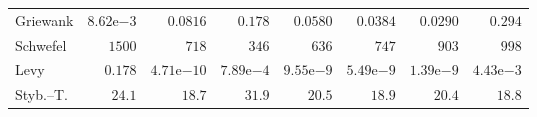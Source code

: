 \begin{tabular}{lrrrrrrr}
Griewank & $8.62\mathrm{e}{-3}$ & $0.0816$ & $0.178$ & $0.0580$ & $0.0384$ & $0.0290$ & $0.294$ \\
Schwefel & $1500$ & $718$ & $346$ & $636$ & $747$ & $903$ & $998$ \\
Levy & $0.178$ & $4.71\mathrm{e}{-10}$ & $7.89\mathrm{e}{-4}$ & $9.55\mathrm{e}{-9}$ & $5.49\mathrm{e}{-9}$ & $1.39\mathrm{e}{-9}$ & $4.43\mathrm{e}{-3}$ \\
Styb.--T. & $24.1$ & $18.7$ & $31.9$ & $20.5$ & $18.9$ & $20.4$ & $18.8$ \\
\bottomrule
\end{tabular}
